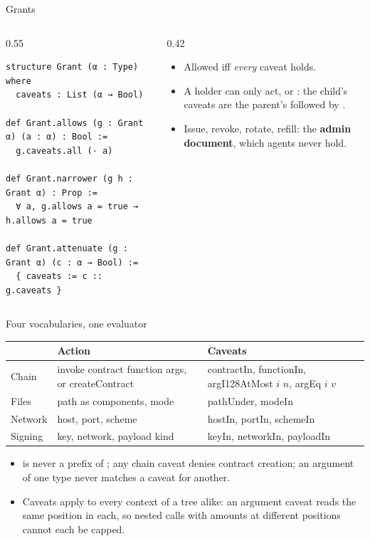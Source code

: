 \documentclass[aspectratio=169,11pt]{beamer}
\begin{document}
\begin{frame}[fragile]{Grants}
  \begin{columns}[T]
    \begin{column}{0.55\linewidth}
\begin{lstlisting}[language=Lean]
structure Grant (α : Type) where
  caveats : List (α → Bool)

def Grant.allows (g : Grant α) (a : α) : Bool :=
  g.caveats.all (· a)

def Grant.narrower (g h : Grant α) : Prop :=
  ∀ a, g.allows a = true → h.allows a = true

def Grant.attenuate (g : Grant α) (c : α → Bool) :=
  { caveats := c :: g.caveats }
\end{lstlisting}
    \end{column}
    \begin{column}{0.42\linewidth}
      \small
      \begin{itemize}
        \item Allowed iff \emph{every} caveat holds.
        \item A holder can only act, or : the child's
          caveats are the parent's followed by .
        \item Issue, revoke, rotate, refill: the \textbf{admin document},
          which agents never hold.
      \end{itemize}
    \end{column}
  \end{columns}
\end{frame}

\begin{frame}{Four vocabularies, one evaluator}
  \small
  \begin{tabularx}{\linewidth}{@{}l>{\raggedright\arraybackslash}X>{\raggedright\arraybackslash}X@{}}
    \toprule
    & \textbf{Action} & \textbf{Caveats} \\
    \midrule
    Chain & invoke contract function args, or createContract
      & contractIn, functionIn, argI128AtMost $i$ $n$, argEq $i$ $v$ \\
    Files & path as components, mode & pathUnder, modeIn \\
    Network & host, port, scheme & hostIn, portIn, schemeIn \\
    Signing & key, network, payload kind & keyIn, networkIn, payloadIn \\
    \bottomrule
  \end{tabularx}
  \medskip
  \begin{itemize}
    \item {} is never a prefix of ;
      any chain caveat denies contract creation;
      an argument of one type never matches a caveat for
      another.
    \item Caveats apply to every context of a tree alike: an argument caveat
      reads the same position in each, so nested
      calls with amounts at different positions cannot each be capped.
  \end{itemize}
\end{frame}
\end{document}
